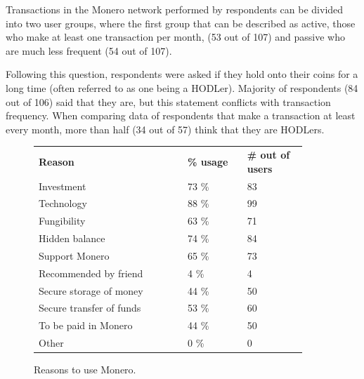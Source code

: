\documentclass[
  printed, %
  table,   %
  lof,     %
  lot,     %
           oneside, color
]{fithesis3}
\begin{document}
Transactions in the Monero network performed by respondents can be divided into two user groups, where the first group that can be described as active, those who make at least one transaction per month, (53 out of 107) and passive who are much less frequent (54 out of 107). 

Following this question, respondents were asked if they hold onto their coins for a long time (often referred to as one being a HODLer). Majority of respondents (84 out of 106) said that they are, but this statement conflicts with transaction frequency. When comparing data of respondents that make a transaction at least every month, more than half (34 out of 57) think that they are HODLers. 

\begin{figure}[H]
\center
\begin{tabular}{p{0.5\linewidth}p{0.2\linewidth}p{0.2\linewidth}}
\textbf{Reason}          & \textbf{\% usage} & \textbf{\# out of users} \\
Investment               & 73 \%             & 83                \\
Technology               & 88 \%             & 99                \\
Fungibility              & 63 \%             & 71                \\
Hidden balance           & 74 \%             & 84                \\
Support Monero           & 65 \%             & 73                \\
Recommended by friend    & 4 \%              & 4                 \\
Secure storage of money  & 44 \%             & 50                \\
Secure transfer of funds & 53 \%             & 60                \\
To be paid in Monero     & 44 \%             & 50                \\
Other                    & 0 \%              & 0                
\end{tabular}
\caption{Reasons to use Monero.}
\label{table:monerousageresearch}
\end{figure}
\end{document}
